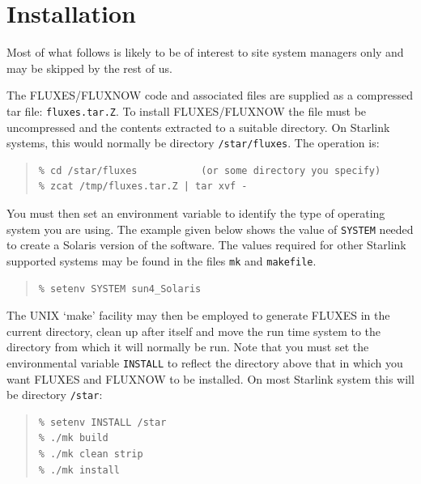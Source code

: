 \documentclass[11pt,twoside]{article}
\newenvironment{myquote}{\begin{quote}\begin{small}}{\end{small}\end{quote}}
\newcommand{\xlabel}[1]{}
\renewcommand{\_}{\texttt{\symbol{95}}}
\begin{document}
\clearpage

\appendix
\section{Installation}
\xlabel{INSTALLATION}
\label{sec:installation}

Most of what follows is likely to be of interest to site system managers only
and may be skipped by the rest of us.

The FLUXES/FLUXNOW code and associated files are supplied as a compressed
tar file: {\tt{fluxes.tar.Z}}.  To install FLUXES/FLUXNOW the file must be
uncompressed and the contents extracted to a suitable directory.  On
Starlink systems, this would normally be directory {\tt{/star/fluxes}}. The
operation is:

\begin{myquote}
\begin{verbatim}
% cd /star/fluxes           (or some directory you specify)
% zcat /tmp/fluxes.tar.Z | tar xvf -
\end{verbatim}
\end{myquote}

You must then set an environment variable to identify the type of operating
system you are using. The example given below shows the value of
{\tt{SYSTEM}} needed to create a Solaris version of the software. The values
required for other Starlink supported systems may be found in the files
{\tt{mk}} and {\tt{makefile}}.

\begin{myquote}
\begin{verbatim}
% setenv SYSTEM sun4_Solaris
\end{verbatim}
\end{myquote}

The UNIX `make' facility may then be employed to generate FLUXES in the
current directory, clean up after itself and move the run time system
to the directory from which it will normally be run.  Note that you must
set the environmental variable {\tt{INSTALL}} to reflect the directory
above that in which you want FLUXES and FLUXNOW to be installed. On
most Starlink system this will be directory {\tt{/star}}:

\begin{myquote}
\begin{verbatim}
% setenv INSTALL /star
% ./mk build
% ./mk clean strip
% ./mk install
\end{verbatim}
\end{myquote}
\end{document}
